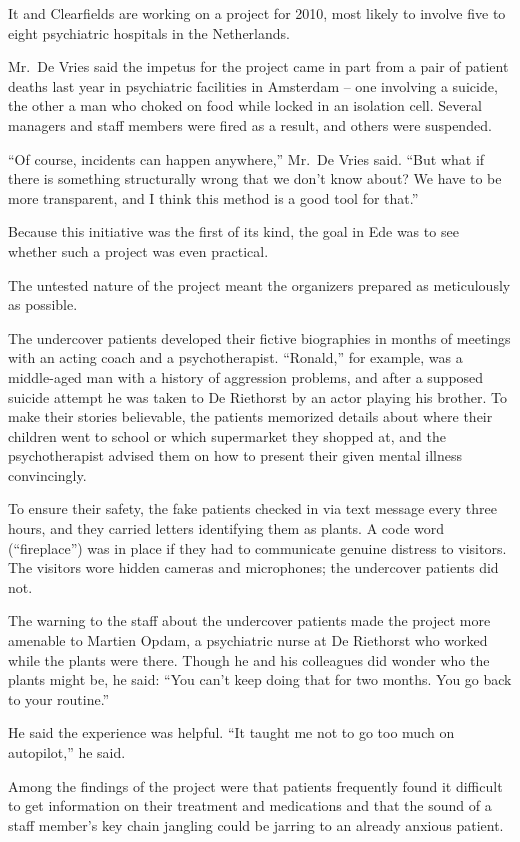 ﻿\documentclass[12pt]{article}
\begin{document}
It and Clearfields are working on a project for 2010, most likely to involve five to eight
psychiatric hospitals in the Netherlands.

Mr.~De Vries said the impetus for the project came in part from a pair of patient deaths last year
in psychiatric facilities in Amsterdam -- one involving a suicide, the other a man who choked on
food while locked in an isolation cell. Several managers and staff members were fired as a result,
and others were suspended.

``Of course, incidents can happen anywhere,'' Mr.~De Vries said. ``But what if there is something
structurally wrong that we don't know about? We have to be more transparent, and I think this method
is a good tool for that.''

Because this initiative was the first of its kind, the goal in Ede was to see whether such a project
was even practical.

The untested nature of the project meant the organizers prepared as meticulously as possible.

The undercover patients developed their fictive biographies in months of meetings with an acting
coach and a psychotherapist. ``Ronald,'' for example, was a middle-aged man with a history of
aggression problems, and after a supposed suicide attempt he was taken to De Riethorst by an actor
playing his brother. To make their stories believable, the patients memorized details about where
their children went to school or which supermarket they shopped at, and the psychotherapist advised
them on how to present their given mental illness convincingly.

To ensure their safety, the fake patients checked in via text message every three hours, and they
carried letters identifying them as plants. A code word (``fireplace'') was in place if they had to
communicate genuine distress to visitors. The visitors wore hidden cameras and microphones; the
undercover patients did not.

The warning to the staff about the undercover patients made the project more amenable to Martien
Opdam, a psychiatric nurse at De Riethorst who worked while the plants were there. Though he and his
colleagues did wonder who the plants might be, he said: ``You can't keep doing that for two months.
You go back to your routine.''

He said the experience was helpful. ``It taught me not to go too much on autopilot,'' he said.

Among the findings of the project were that patients frequently found it difficult to get
information on their treatment and medications and that the sound of a staff member's key chain
jangling could be jarring to an already anxious patient.
\end{document}
